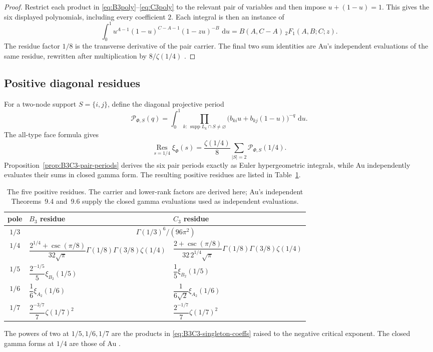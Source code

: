 \documentclass[11pt]{article}
\newcommand{\Res}{\operatorname*{Res}}
\newcommand{\supp}{\operatorname{supp}}
\newcommand{\dd}{\,\mathrm d}
\newcommand{\cP}{\mathcal P}
\begin{document}
\begin{proof}
Restrict each product in \eqref{eq:B3poly}--\eqref{eq:C3poly} to the
relevant pair of variables and then impose \(u+(1-u)=1\).  This gives
the six displayed polynomials, including every coefficient \(2\).
Each integral is then an instance of
\[
 \int_0^1u^{A-1}(1-u)^{C-A-1}(1-zu)^{-B}\,\dd u
 =B(A,C-A)\,{}_2F_1(A,B;C;z).
\]
The residue factor \(1/8\) is the transverse derivative of the pair
carrier.  The final two sum identities are Au's independent
evaluations of the same residue, rewritten after multiplication by
\(8/\zeta(1/4)\) \cite[Theorems~9.4 and~9.6]{Au2025}.
\end{proof}

\subsection{Positive diagonal residues}

For a two-node support \(S=\{i,j\}\), define the diagonal projective
period
\begin{equation}\label{eq:B3C3-pairperiod}
 \cP_{\Phi,S}(q)
 =\int_0^1
 \prod_{k:\,\supp L_k\cap S\ne\varnothing}
 \bigl(b_{ki}u+b_{kj}(1-u)\bigr)^{-q}\,\dd u.
\end{equation}
The all-type face formula gives
\begin{equation}\label{eq:B3C3-quarter-period}
 \Res_{s=1/4}\xi_\Phi(s)
 =\frac{\zeta(1/4)}8
 \sum_{|S|=2}\cP_{\Phi,S}(1/4).
\end{equation}
Proposition~\ref{prop:B3C3-pair-periods} derives the six pair periods
exactly as Euler hypergeometric integrals, while Au independently
evaluates their sums in closed gamma form.  The resulting positive
residues are listed in Table~\ref{tab:B3C3-positive}.
\begin{table}[ht]
\centering
\small
\begin{tabularx}{\textwidth}{@{}c X X@{}}
\toprule
pole & \(B_3\) residue & \(C_3\) residue\\
\midrule
\(1/3\)&\multicolumn{2}{c}{\(\Gamma(1/3)^6/(96\pi^2)\)}\\
\(1/4\)&
\(\dfrac{2^{1/4}+\csc(\pi/8)}{32\sqrt\pi}
 \Gamma(1/8)\Gamma(3/8)\zeta(1/4)\)&
\(\dfrac{2+\csc(\pi/8)}{32\,2^{1/4}\sqrt\pi}
 \Gamma(1/8)\Gamma(3/8)\zeta(1/4)\)\\
\(1/5\)&\(\dfrac{2^{-1/5}}5\xi_{B_2}(1/5)\)&
\(\dfrac15\xi_{B_2}(1/5)\)\\
\(1/6\)&\(\dfrac16\xi_{A_2}(1/6)\)&
\(\dfrac1{6\sqrt2}\xi_{A_2}(1/6)\)\\
\(1/7\)&\(\dfrac{2^{-3/7}}7\zeta(1/7)^2\)&
\(\dfrac{2^{-1/7}}7\zeta(1/7)^2\)\\
\bottomrule
\end{tabularx}
\caption{The five positive residues.  The carrier and lower-rank factors
are derived here; Au's independent Theorems~9.4 and~9.6 supply the closed
gamma evaluations used as independent evaluations.}
\label{tab:B3C3-positive}
\end{table}
The powers of two at \(1/5,1/6,1/7\) are the products in
\eqref{eq:B3C3-singleton-coeffs} raised to the negative critical
exponent.  The closed gamma forms at \(1/4\) are those of
Au \cite[Theorems~9.4 and~9.6]{Au2025}.
\end{document}
